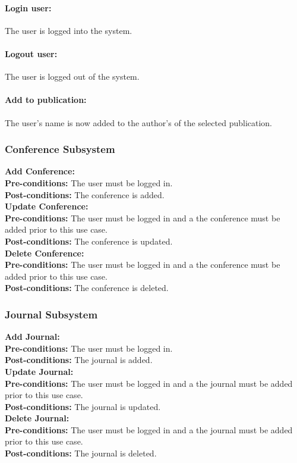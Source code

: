 \documentclass{article}
\begin{document}
				\paragraph{Login user:} The user is logged into the system.
				\paragraph{Logout user:} The user is logged out of the system.
				\paragraph{Add to publication:} The user's name is now added to the author's of the selected publication.
			\subsubsection{Conference Subsystem}
				\textbf{Add Conference:}\\
					\indent \textbf{Pre-conditions:} The user must be logged in.\\
					\indent \textbf{Post-conditions:} The conference is added.\\
				\textbf{Update Conference:}\\
					\indent \textbf{Pre-conditions:} The user must be logged in and a the conference must be added prior to this use case.\\
					\indent \textbf{Post-conditions:} The conference is updated.\\
				\textbf{Delete Conference:}\\
					\indent \textbf{Pre-conditions:} The user must be logged in and a the conference must be added prior to this use case.\\
					\indent \textbf{Post-conditions:} The conference is deleted.\\
			\subsubsection{Journal Subsystem}
				\textbf{Add Journal:}\\
					\indent \textbf{Pre-conditions:} The user must be logged in.\\
					\indent \textbf{Post-conditions:} The journal is added.\\
				\textbf{Update Journal:}\\
					\indent \textbf{Pre-conditions:} The user must be logged in and a the journal must be added prior to this use case.\\
					\indent \textbf{Post-conditions:} The journal is updated.\\
				\textbf{Delete Journal:}\\
					\indent \textbf{Pre-conditions:} The user must be logged in and a the journal must be added prior to this use case.\\
					\indent \textbf{Post-conditions:} The journal is deleted.\\
\end{document}
